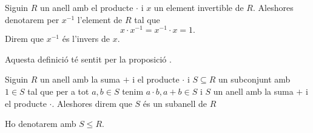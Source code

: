 \documentclass[../Apunts.tex]{subfiles}
\begin{document}
	\begin{definition}
		\label{def:l'invers d'un element d'un anell}
		Siguin \(R\) un anell amb el producte \(\cdot\) i \(x\) un element invertible de \(R\). Aleshores denotarem per \(x^{-1}\) l'element de \(R\) tal que
		\[x\cdot x^{-1}=x^{-1}\cdot x=1.\]
		Direm que \(x^{-1}\) és l'invers de \(x\).
		
		Aquesta definició té sentit per la proposició .
	\end{definition}
	\begin{definition}[Subanell]
		\label{def:subanell}
		Siguin \(R\) un anell amb la suma \(+\) i el producte \(\cdot\) i \(S\subseteq R\) un subconjunt amb \(1\in S\) tal que per a tot \(a,b\in S\) tenim \(a\cdot b,a+b\in S\) i \(S\) un anell amb la suma \(+\) i el producte \(\cdot\). Aleshores direm que \(S\) és un subanell de \(R\)
		
		Ho denotarem amb \(S\leq R\).
	\end{definition}
\end{document}
